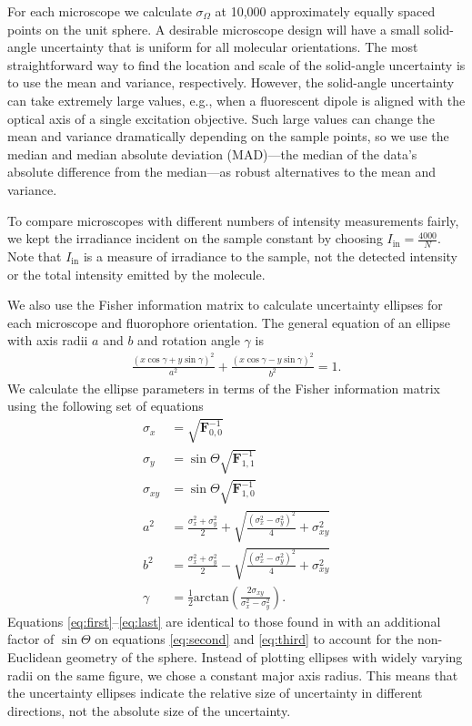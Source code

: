 \documentclass[10pt]{article}
\providecommand{\mb}[1]{\mathbf{#1}}
\begin{document}
For each microscope we calculate $\sigma_{\Omega}$ at 10,000 approximately
equally spaced points on the unit sphere. A desirable microscope design will
have a small solid-angle uncertainty that is uniform for all molecular
orientations. The most straightforward way to find the location and scale of the
solid-angle uncertainty is to use the mean and variance, respectively. However,
the solid-angle uncertainty can take extremely large values, e.g., when a
fluorescent dipole is aligned with the optical axis of a single excitation
objective. Such large values can change the mean and variance dramatically
depending on the sample points, so we use the median and median absolute
deviation (MAD)---the median of the data's absolute difference from the
median---as robust alternatives to the mean and variance.

To compare microscopes with different numbers of intensity measurements fairly,
we kept the irradiance incident on the sample constant by choosing
$I_{\text{in}} = \frac{4000}{N}$. Note that $I_{\text{in}}$ is a measure of
irradiance to the sample, not the detected intensity or the total intensity
emitted by the molecule.

We also use the Fisher information matrix to calculate uncertainty ellipses for
each microscope and fluorophore orientation. The general equation of an ellipse
with axis radii $a$ and $b$ and rotation angle $\gamma$ is
\begin{align}
  \frac{(x\cos\gamma + y\sin\gamma)^2}{a^2} + \frac{(x\cos\gamma - y\sin\gamma)^2}{b^2} =1. 
\end{align}
We calculate the ellipse parameters in terms of the Fisher information matrix
using the following set of equations
\begin{align}
  \sigma_x &= \sqrt{\mb{F}^{-1}_{0,0}} \label{eq:first}\\
  \sigma_y &= \sin\Theta\sqrt{\mb{F}^{-1}_{1,1}} \label{eq:second}\\ 
  \sigma_{xy} &= \sin\Theta\sqrt{\mb{F}^{-1}_{1,0}} \label{eq:third}\\  
  a^2 &= \frac{\sigma_x^2 + \sigma_y^2}{2} + \sqrt{\frac{(\sigma_x^2 - \sigma_y^2)^2}{4} + \sigma_{xy}^2}\\
  b^2 &= \frac{\sigma_x^2 + \sigma_y^2}{2} - \sqrt{\frac{(\sigma_x^2 - \sigma_y^2)^2}{4} + \sigma_{xy}^2}\\
  \gamma &= \frac{1}{2}\text{arctan}\left(\frac{2\sigma_{xy}}{\sigma_x^2 - \sigma_y^2}\right). \label{eq:last}
\end{align}
Equations \ref{eq:first}--\ref{eq:last} are identical to those found in
\cite{coe2009} with an additional factor of $\sin\Theta$ on equations
\ref{eq:second} and \ref{eq:third} to account for the non-Euclidean geometry of
the sphere. Instead of plotting ellipses with widely varying radii on the same
figure, we chose a constant major axis radius. This means that the uncertainty
ellipses indicate the relative size of uncertainty in different directions, not
the absolute size of the uncertainty.
\end{document}
